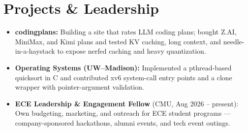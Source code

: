 \documentclass[11pt, letterpaper]{article}
\begin{document}
\section{Projects \& Leadership}
\begin{itemize}
  \item \textbf{codingplans:} Building a site that rates LLM coding plans; bought Z.AI, MiniMax, and Kimi plans and tested KV caching, long context, and needle-in-a-haystack to expose nerfed caching and heavy quantization.
  \item \textbf{Operating Systems (UW--Madison):} Implemented a pthread-based quicksort in C and contributed xv6 system-call entry points and a clone wrapper with pointer-argument validation.
  \item \textbf{ECE Leadership \& Engagement Fellow} (CMU, Aug 2026 -- present): Own budgeting, marketing, and outreach for ECE student programs --- company-sponsored hackathons, alumni events, and tech event outings.
\end{itemize}
\end{document}
